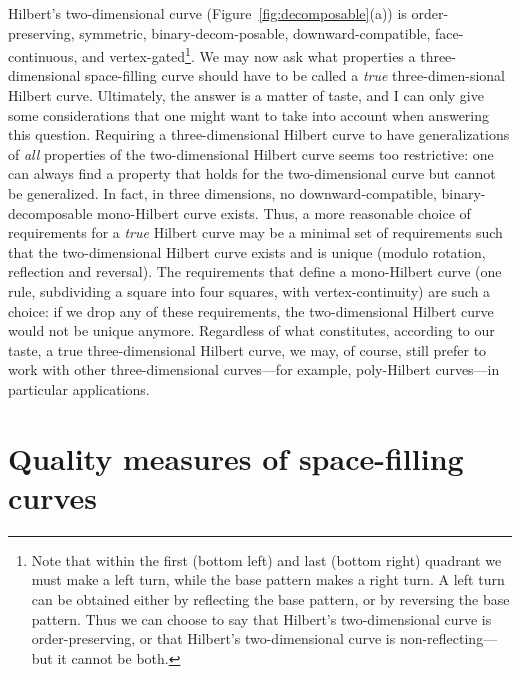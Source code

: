 \documentclass[11pt,a4paper]{article}
\begin{document}
Hilbert's two-dimensional curve (Figure~\ref{fig:decomposable}(a)) is order-preserving, symmetric, binary-decom-posable, downward-compatible, face-continuous, and vertex-gated\footnote{Note that within the first (bottom left) and last (bottom right) quadrant we must make a left turn, while the base pattern makes a right turn. A left turn can be obtained either by reflecting the base pattern, or by reversing the base pattern. Thus we can choose to say that Hilbert's two-dimensional curve is order-preserving, or that Hilbert's two-dimensional curve is non-reflecting---but it cannot be both.}. We may now ask what properties a three-dimensional space-filling curve should have to be called a \emph{true} three-dimen-sional Hilbert curve. Ultimately, the answer is a matter of taste, and I can only give some considerations that one might want to take into account when answering this question. Requiring a three-dimensional Hilbert curve to have generalizations of \emph{all} properties of the two-dimensional Hilbert curve seems too restrictive: one can always find a property that holds for the two-dimensional curve but cannot be generalized. In fact, in three dimensions, no downward-compatible, binary-decomposable mono-Hilbert curve exists. Thus, a more reasonable choice of requirements for a \emph{true} Hilbert curve may be a minimal set of requirements such that the two-dimensional Hilbert curve exists and is unique (modulo rotation, reflection and reversal). The requirements that define a mono-Hilbert curve (one rule, subdividing a square into four squares, with vertex-continuity) are such a choice: if we drop any of these requirements, the two-dimensional Hilbert curve would not be unique anymore. Regardless of what constitutes, according to our taste, a true three-dimensional Hilbert curve, we may, of course, still prefer to work with other three-dimensional curves---for example, poly-Hilbert curves---in particular applications.

\section{Quality measures of space-filling curves}
\label{sec:measures}
\end{document}
